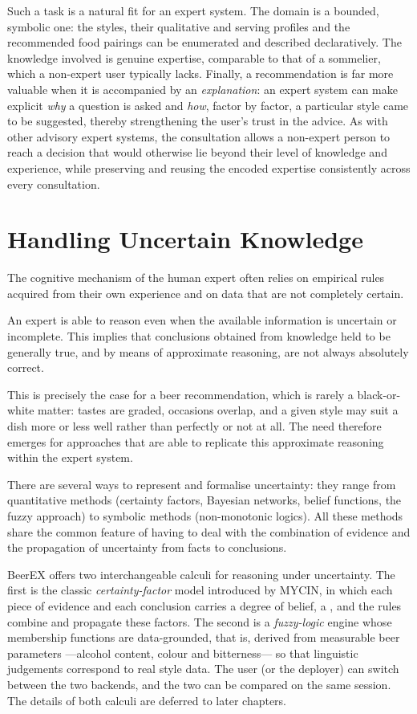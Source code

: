 Such a task is a natural fit for an expert system. The domain is a bounded,
symbolic one: the styles, their qualitative and serving profiles and the
recommended food pairings can be enumerated and described declaratively. The
knowledge involved is genuine expertise, comparable to that of a sommelier,
which a non-expert user typically lacks. Finally, a recommendation is far more
valuable when it is accompanied by an \emph{explanation}: an expert system can
make explicit \emph{why} a question is asked and \emph{how}, factor by factor, a
particular style came to be suggested, thereby strengthening the user's trust in
the advice. As with other advisory expert systems, the consultation allows a
non-expert person to reach a decision that would otherwise lie beyond their level
of knowledge and experience, while preserving and reusing the encoded expertise
consistently across every consultation.


\section{Handling Uncertain Knowledge}

The cognitive mechanism of the human expert often relies on empirical rules
acquired from their own experience and on data that are not completely certain.

An expert is able to reason even when the available information is uncertain or
incomplete. This implies that conclusions obtained from knowledge held to be
generally true, and by means of approximate reasoning, are not always absolutely
correct.

This is precisely the case for a beer recommendation, which is rarely a
black-or-white matter: tastes are graded, occasions overlap, and a given style
may suit a dish more or less well rather than perfectly or not at all. The need
therefore emerges for approaches that are able to replicate this approximate
reasoning within the expert system.

There are several ways to represent and formalise uncertainty: they range from
quantitative methods (certainty factors, Bayesian networks, belief functions,
the fuzzy approach) to symbolic methods (non-monotonic logics). All these
methods share the common feature of having to deal with the combination of
evidence and the propagation of uncertainty from facts to conclusions.

BeerEX offers two interchangeable calculi for reasoning under uncertainty. The
first is the classic \emph{certainty-factor} model introduced by MYCIN, in which
each piece of evidence and each conclusion carries a degree of belief, a \cf,
and the rules combine and propagate these factors. The second is a
\emph{fuzzy-logic} engine whose membership functions are data-grounded, that is,
derived from measurable beer parameters ---alcohol content, colour and
bitterness--- so that linguistic judgements correspond to real style data. The
user (or the deployer) can switch between the two backends, and the two can be
compared on the same session. The details of both calculi are deferred to later
chapters.


